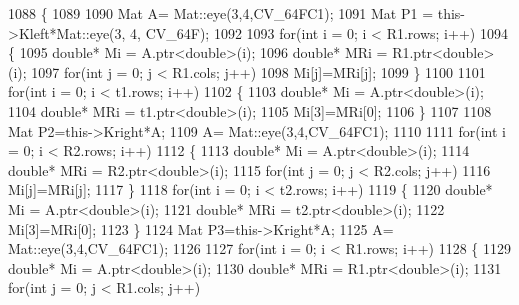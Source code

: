 \begin{DoxyCode}
1088                                                                                                            
                                 \{
1089 
1090         Mat A= Mat::eye(3,4,CV\_64FC1);
1091         Mat P1 = this->Kleft*Mat::eye(3, 4, CV\_64F);
1092 
1093         \textcolor{keywordflow}{for}(\textcolor{keywordtype}{int} i = 0; i < R1.rows; i++)
1094          \{
1095              \textcolor{keywordtype}{double}* Mi = A.ptr<\textcolor{keywordtype}{double}>(i);
1096              \textcolor{keywordtype}{double}* MRi = R1.ptr<\textcolor{keywordtype}{double}>(i);
1097                 \textcolor{keywordflow}{for}(\textcolor{keywordtype}{int} j = 0; j < R1.cols; j++)
1098                      Mi[j]=MRi[j];
1099          \}
1100          
1101         \textcolor{keywordflow}{for}(\textcolor{keywordtype}{int} i = 0; i < t1.rows; i++)
1102          \{
1103              \textcolor{keywordtype}{double}* Mi = A.ptr<\textcolor{keywordtype}{double}>(i);
1104              \textcolor{keywordtype}{double}* MRi = t1.ptr<\textcolor{keywordtype}{double}>(i);
1105              Mi[3]=MRi[0];
1106          \}
1107 
1108         Mat P2=this->Kright*A;
1109         A= Mat::eye(3,4,CV\_64FC1);
1110         
1111         \textcolor{keywordflow}{for}(\textcolor{keywordtype}{int} i = 0; i < R2.rows; i++)
1112          \{
1113              \textcolor{keywordtype}{double}* Mi = A.ptr<\textcolor{keywordtype}{double}>(i);
1114              \textcolor{keywordtype}{double}* MRi = R2.ptr<\textcolor{keywordtype}{double}>(i);
1115                 \textcolor{keywordflow}{for}(\textcolor{keywordtype}{int} j = 0; j < R2.cols; j++)
1116                      Mi[j]=MRi[j];
1117          \}
1118         \textcolor{keywordflow}{for}(\textcolor{keywordtype}{int} i = 0; i < t2.rows; i++)
1119          \{
1120              \textcolor{keywordtype}{double}* Mi = A.ptr<\textcolor{keywordtype}{double}>(i);
1121              \textcolor{keywordtype}{double}* MRi = t2.ptr<\textcolor{keywordtype}{double}>(i);
1122              Mi[3]=MRi[0];
1123          \}
1124         Mat P3=this->Kright*A;
1125         A= Mat::eye(3,4,CV\_64FC1);
1126 
1127         \textcolor{keywordflow}{for}(\textcolor{keywordtype}{int} i = 0; i < R1.rows; i++)
1128          \{
1129              \textcolor{keywordtype}{double}* Mi = A.ptr<\textcolor{keywordtype}{double}>(i);
1130              \textcolor{keywordtype}{double}* MRi = R1.ptr<\textcolor{keywordtype}{double}>(i);
1131              \textcolor{keywordflow}{for}(\textcolor{keywordtype}{int} j = 0; j < R1.cols; j++)

\end{DoxyCode}
